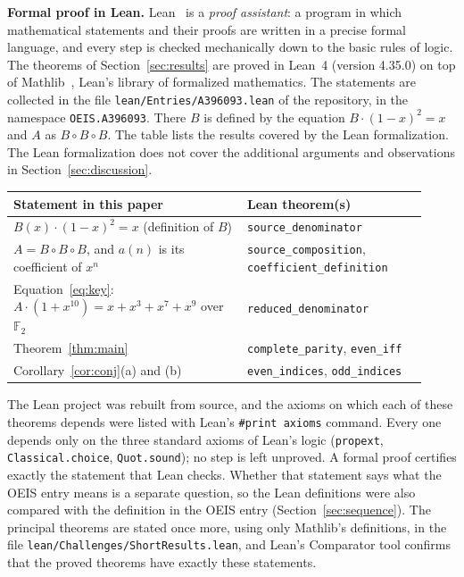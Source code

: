 \documentclass[11pt,a4paper]{article}
\theoremstyle{definition}
\theoremstyle{remark}
\newcommand{\F}{\mathbb{F}}
\newcommand{\para}[1]{\par\medskip\noindent\textbf{#1}\enspace}
\begin{document}
\para{Formal proof in Lean.}
Lean~\cite{lean} is a \emph{proof assistant}: a program in which mathematical statements and their proofs are written
in a precise formal language, and every step is checked mechanically down to the basic rules of logic. The theorems of Section~\ref{sec:results} are proved in Lean~4 (version 4.35.0) on top of
Mathlib~\cite{mathlib}, Lean's library of formalized mathematics. The statements are collected in the file \texttt{lean/Entries/A396093.lean} of the repository,
in the namespace \texttt{OEIS.A396093}. There $B$ is defined by the equation $B\cdot(1-x)^2=x$ and $A$ as $B\circ B\circ B$.
The table lists the results covered by the Lean formalization. The Lean formalization does not cover the additional arguments and observations in Section~\ref{sec:discussion}.
\begin{center}\small\renewcommand{\arraystretch}{1.25}
\begin{tabular}{>{\raggedright\arraybackslash}p{0.52\linewidth}>{\raggedright\arraybackslash}p{0.4\linewidth}}
\toprule
Statement in this paper & Lean theorem(s)\\
\midrule
$B(x)\cdot(1-x)^2=x$ (definition of $B$) & \texttt{source\_\allowbreak{}denominator} \\
$A=B\circ B\circ B$, and $a(n)$ is its coefficient of $x^n$ & \texttt{source\_\allowbreak{}composition}, \texttt{coefficient\_\allowbreak{}definition} \\
Equation~\eqref{eq:key}: $A\cdot(1+x^{10})=x+x^3+x^7+x^9$ over $\F_2$ & \texttt{reduced\_\allowbreak{}denominator} \\
Theorem~\ref{thm:main} & \texttt{complete\_\allowbreak{}parity}, \texttt{even\_\allowbreak{}iff} \\
Corollary~\ref{cor:conj}(a) and (b) & \texttt{even\_\allowbreak{}indices}, \texttt{odd\_\allowbreak{}indices} \\
\bottomrule
\end{tabular}
\end{center}
The Lean project was rebuilt from source, and the axioms on which each of these theorems depends were listed with
Lean's \texttt{\#print axioms} command. Every one depends only on the three standard axioms of Lean's logic
(\texttt{propext}, \texttt{Classical.choice}, \texttt{Quot.sound}); no step is left unproved. A formal proof certifies
exactly the statement that Lean checks. Whether that statement says what the OEIS entry means is a separate question,
so the Lean definitions were also compared with the definition in the OEIS entry
(Section~\ref{sec:sequence}). The principal theorems are stated once more, using only Mathlib's definitions, in the
file \texttt{lean/Challenges/ShortResults.lean}, and Lean's Comparator tool confirms that the
proved theorems have exactly these statements.
\end{document}
